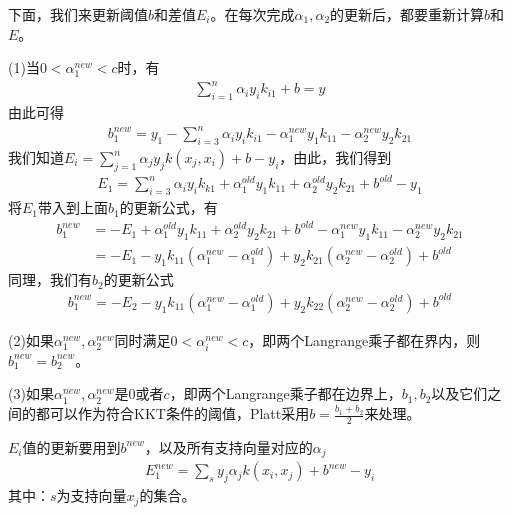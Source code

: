         \par
        下面，我们来更新阈值$b$和差值$E_i$。在每次完成$\alpha_1,\alpha_2$的更新后，都要重新计算$b$和$E$。
        \par
        (1)当$0<\alpha_1^{new}<c$时，有
        \begin{align*}
        \sum_{i=1}^n \alpha_iy_ik_{i1}+b = y
        \end{align*}
        由此可得
        \begin{align*}
        b_1^{new} = y_1-\sum_{i=3}^n\alpha_iy_ik_{i1}-\alpha_1^{new}y_1k_{11}-\alpha_2^{new}y_2k_{21}
        \end{align*}
        我们知道$E_i = \sum_{j=1}^n\alpha_j y_jk(x_j,x_i)+b-y_i  $，由此，我们得到
        \begin{align*}
        E_1 = \sum_{i=3}^n\alpha_i y_ik_{k1}+\alpha_1^{old}y_1k_{11}+\alpha_2^{old}y_2k_{21}+b^{old}-y_1
        \end{align*}
        将$E_1$带入到上面$b_1$的更新公式，有
        \begin{align*}
        b_1^{new} &= -E_1 + \alpha_1^{old}y_1k_{11}+\alpha_2^{old}y_2k_{21}+b^{old}-\alpha_1^{new}y_1k_{11}-\alpha_2^{new}y_2k_{21}\\
        &=-E_1-y_1k_{11}(\alpha_1^{new}-\alpha_1^{old})+y_2k_{21}(\alpha_2^{new}-\alpha_2^{old})+b^{old}
        \end{align*}
        同理，我们有$b_2$的更新公式
        \begin{align*}
        b_1^{new} =-E_2-y_1k_{11}(\alpha_1^{new}-\alpha_1^{old})+y_2k_{22}(\alpha_2^{new}-\alpha_2^{old})+b^{old}
        \end{align*}
        \par
        (2)如果$\alpha_1^{new},\alpha_2^{new}$同时满足$0<\alpha_i^{new}<c$，即两个Langrange乘子都在界内，则$b^{new}_1=b_2^{new}$。
        \par
        (3)如果$\alpha_1^{new},\alpha_2^{new}$是0或者$c$，即两个Langrange乘子都在边界上，$b_1,b_2$以及它们之间的都可以作为符合KKT条件的阈值，Platt采用$b = \frac{b_1+b_2}{2}$来处理。
        \par
        $E_i$值的更新要用到$b^{new}$，以及所有支持向量对应的$\alpha_j$
        \begin{align*}
        E_1^{new} = \sum_{s} y_j\alpha_j k(x_i,x_j)+b^{new} - y_i
        \end{align*}
        其中：$s$为支持向量$x_j$的集合。

